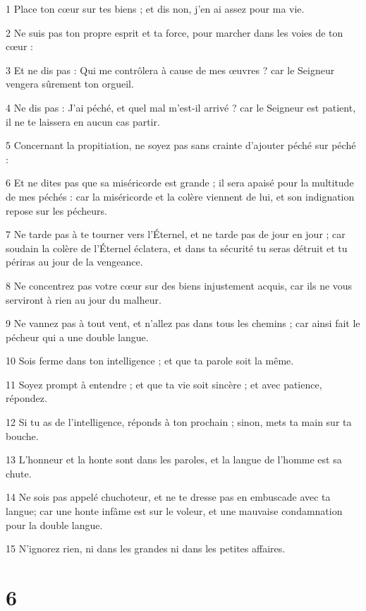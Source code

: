 \par 1 Place ton cœur sur tes biens ; et dis non, j'en ai assez pour ma vie.
\par 2 Ne suis pas ton propre esprit et ta force, pour marcher dans les voies de ton cœur :
\par 3 Et ne dis pas : Qui me contrôlera à cause de mes œuvres ? car le Seigneur vengera sûrement ton orgueil.
\par 4 Ne dis pas : J'ai péché, et quel mal m'est-il arrivé ? car le Seigneur est patient, il ne te laissera en aucun cas partir.
\par 5 Concernant la propitiation, ne soyez pas sans crainte d'ajouter péché sur péché :
\par 6 Et ne dites pas que sa miséricorde est grande ; il sera apaisé pour la multitude de mes péchés : car la miséricorde et la colère viennent de lui, et son indignation repose sur les pécheurs.
\par 7 Ne tarde pas à te tourner vers l'Éternel, et ne tarde pas de jour en jour ; car soudain la colère de l'Éternel éclatera, et dans ta sécurité tu seras détruit et tu périras au jour de la vengeance.
\par 8 Ne concentrez pas votre cœur sur des biens injustement acquis, car ils ne vous serviront à rien au jour du malheur.
\par 9 Ne vannez pas à tout vent, et n'allez pas dans tous les chemins ; car ainsi fait le pécheur qui a une double langue.
\par 10 Sois ferme dans ton intelligence ; et que ta parole soit la même.
\par 11 Soyez prompt à entendre ; et que ta vie soit sincère ; et avec patience, répondez.
\par 12 Si tu as de l'intelligence, réponds à ton prochain ; sinon, mets ta main sur ta bouche.
\par 13 L'honneur et la honte sont dans les paroles, et la langue de l'homme est sa chute.
\par 14 Ne sois pas appelé chuchoteur, et ne te dresse pas en embuscade avec ta langue; car une honte infâme est sur le voleur, et une mauvaise condamnation pour la double langue.
\par 15 N'ignorez rien, ni dans les grandes ni dans les petites affaires.

\chapter{6}

